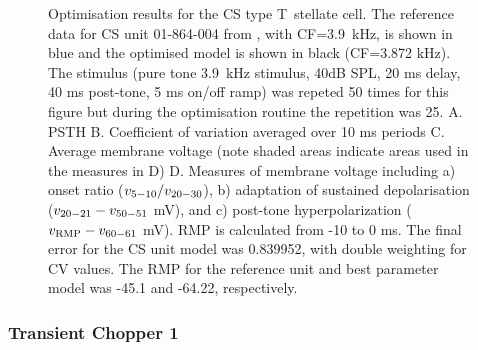 \begin{figure}[htb]
  \centering
 
  \caption[CS T~stellate Optimisation results]{Optimisation results for the CS
    type T~stellate cell. The reference data for CS unit 01-864-004 from
    \citep{PaoliniClareyEtAl:2005}, with CF=3.9~kHz, is shown in blue and the
    optimised model is shown in black (CF=3.872 kHz). The stimulus (pure tone
    3.9~kHz stimulus, 40dB SPL, 20 ms delay, 40 ms post-tone, 5 ms on/off ramp)
    was repeted 50 times for this figure but during the optimisation routine the
    repetition was 25. A. PSTH B. Coefficient of variation averaged over 10 ms
    periods C. Average membrane voltage (note shaded areas indicate areas used
    in the measures in D) D. Measures of membrane voltage including a) onset
    ratio ($v_{\rm 5-10}/v_{\rm 20-30}$), b) adaptation of sustained
    depolarisation ($v_{\rm 20-21} - v_{\rm 50-51}$ mV), and c) post-tone
    hyperpolarization ($v_{\rm RMP} - v_{\rm 60-61}$ mV). RMP is calculated from
    -10 to 0 ms.  The final error for the CS unit model was 0.839952, with
    double weighting for CV values.  The RMP for the reference unit and best
    parameter model was -45.1 and -64.22, respectively.  }
  \label{fig:CSresults}
\end{figure}



\clearpage
\subsubsection{Transient Chopper 1}

